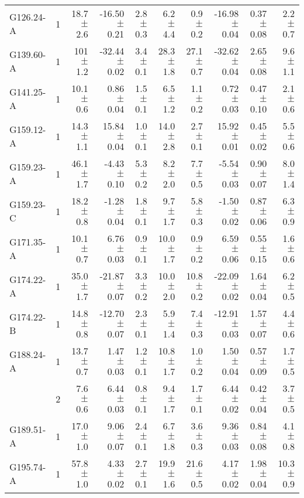 \documentclass[printer]{aa}
\begin{document}
\begin{table*}[h]
\begin{tabular}{l c r r r r r r r r}
G126.24-A & 1 &  18.7 $\pm$ 2.6 & -16.50 $\pm$ 0.21 & 2.8 $\pm$ 0.3 &  6.2 $\pm$  4.4 &  0.9 $\pm$ 0.2 & -16.98 $\pm$ 0.04 & 0.37 $\pm$ 0.08 &  2.2 $\pm$ 0.7 \\
G139.60-A & 1 & 101 $\pm$ 1.2 & -32.44 $\pm$ 0.02 & 3.4 $\pm$ 0.1 & 28.3 $\pm$  1.8 & 27.1 $\pm$ 0.7 & -32.62 $\pm$ 0.04 & 2.65 $\pm$ 0.08 &  9.6 $\pm$ 1.1 \\
G141.25-A & 1 &  10.1 $\pm$ 0.6 &   0.86 $\pm$ 0.04 & 1.5 $\pm$ 0.1 &  6.5 $\pm$  1.2 &  1.1 $\pm$ 0.2 &   0.72 $\pm$ 0.03 & 0.47 $\pm$ 0.10 &  2.1 $\pm$ 0.6 \\
G159.12-A & 1 &  14.3 $\pm$ 1.1 &  15.84 $\pm$ 0.04 & 1.0 $\pm$ 0.1 & 14.0 $\pm$  2.8 &  2.7 $\pm$ 0.1 &  15.92 $\pm$ 0.01 & 0.45 $\pm$ 0.02 &  5.5 $\pm$ 0.6 \\
G159.23-A & 1 &  46.1 $\pm$ 1.7 &  -4.43 $\pm$ 0.10 & 5.3 $\pm$ 0.2 &  8.2 $\pm$  2.0 &  7.7 $\pm$ 0.5 &  -5.54 $\pm$ 0.03 & 0.90 $\pm$ 0.07 &  8.0 $\pm$ 1.4 \\
G159.23-C & 1 &  18.2 $\pm$ 0.8 &  -1.28 $\pm$ 0.04 & 1.8 $\pm$ 0.1 &  9.7 $\pm$  1.7 &  5.8 $\pm$ 0.3 &  -1.50 $\pm$ 0.02 & 0.87 $\pm$ 0.06 &  6.3 $\pm$ 0.9 \\
G171.35-A & 1 &  10.1 $\pm$ 0.7 &   6.76 $\pm$ 0.03 & 0.9 $\pm$ 0.1 & 10.0 $\pm$  1.7 &  0.9 $\pm$ 0.2 &   6.59 $\pm$ 0.06 & 0.55 $\pm$ 0.15 &  1.6 $\pm$ 0.6 \\
G174.22-A & 1 &  35.0 $\pm$ 1.7 & -21.87 $\pm$ 0.07 & 3.3 $\pm$ 0.2 & 10.0 $\pm$  2.0 & 10.8 $\pm$ 0.2 & -22.09 $\pm$ 0.02 & 1.64 $\pm$ 0.04 &  6.2 $\pm$ 0.5 \\
G174.22-B & 1 &  14.8 $\pm$ 0.8 & -12.70 $\pm$ 0.07 & 2.3 $\pm$ 0.1 &  5.9 $\pm$  1.4 &  7.4 $\pm$ 0.3 & -12.91 $\pm$ 0.03 & 1.57 $\pm$ 0.07 &  4.4 $\pm$ 0.6 \\
G188.24-A & 1 &  13.7 $\pm$ 0.7 &   1.47 $\pm$ 0.03 & 1.2 $\pm$ 0.1 & 10.8 $\pm$  1.7 &  1.0 $\pm$ 0.2 &   1.50 $\pm$ 0.04 & 0.57 $\pm$ 0.09 &  1.7 $\pm$ 0.5 \\
 & 2 &   7.6 $\pm$ 0.6 &   6.44 $\pm$ 0.03 & 0.8 $\pm$ 0.1 &  9.4 $\pm$  1.7 &  1.7 $\pm$ 0.1 &   6.44 $\pm$ 0.02 & 0.42 $\pm$ 0.04 &  3.7 $\pm$ 0.5 \\
G189.51-A & 1 &  17.0 $\pm$ 1.0 &   9.06 $\pm$ 0.07 & 2.4 $\pm$ 0.1 &  6.7 $\pm$  1.8 &  3.6 $\pm$ 0.3 &   9.36 $\pm$ 0.03 & 0.84 $\pm$ 0.08 &  4.1 $\pm$ 0.8 \\
G195.74-A & 1 &  57.8 $\pm$ 1.0 &   4.33 $\pm$ 0.02 & 2.7 $\pm$ 0.1 & 19.9 $\pm$  1.6 & 21.6 $\pm$ 0.5 &   4.17 $\pm$ 0.02 & 1.98 $\pm$ 0.04 & 10.3 $\pm$ 0.9 \\

\end{tabular}
\end{table*}
\end{document}

